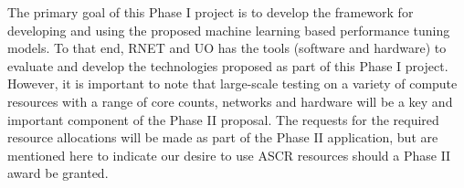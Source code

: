 The primary goal of this Phase I project is to develop the framework for developing and using the proposed machine learning based performance tuning models. 
To that end, RNET and UO has the tools (software and hardware) to evaluate and develop the technologies proposed as part of this Phase I project. However, it is important to note  that large-scale testing on a variety of compute resources with a range of core counts, networks and hardware will be a key and important component of the Phase II proposal. The requests for the required resource allocations will be made as part of the Phase II application, but are mentioned here to indicate our desire to use ASCR resources should a Phase II award be granted.  
